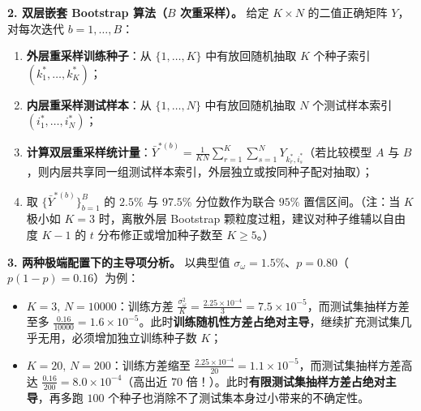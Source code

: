 \textbf{2. 双层嵌套 Bootstrap 算法（$B$ 次重采样）。}
给定 $K \times N$ 的二值正确矩阵 $Y$，对每次迭代 $b = 1, \dots, B$：
\begin{enumerate}
  \item \textbf{外层重采样训练种子}：从 $\{1,\dots,K\}$ 中有放回随机抽取 $K$ 个种子索引 $(k_1^*,\dots,k_K^*)$；
  \item \textbf{内层重采样测试样本}：从 $\{1,\dots,N\}$ 中有放回随机抽取 $N$ 个测试样本索引 $(i_1^*,\dots,i_N^*)$；
  \item \textbf{计算双层重采样统计量}：$\bar{Y}^{*(b)} = \frac{1}{KN}\sum_{r=1}^K\sum_{s=1}^N Y_{k_r^*, i_s^*}$（若比较模型 $A$ 与 $B$，则内层共享同一组测试样本索引，外层独立或按同种子配对抽取）；
  \item 取 $\{\bar{Y}^{*(b)}\}_{b=1}^B$ 的 $2.5\%$ 与 $97.5\%$ 分位数作为联合 $95\%$ 置信区间。（注：当 $K$ 极小如 $K=3$ 时，离散外层 Bootstrap 颗粒度过粗，建议对种子维辅以自由度 $K-1$ 的 $t$ 分布修正或增加种子数至 $K \ge 5$。）
\end{enumerate}

\textbf{3. 两种极端配置下的主导项分析。}
以典型值 $\sigma_\omega = 1.5\%$、$p = 0.80$（$p(1-p)=0.16$）为例：
\begin{itemize}
  \item \textbf{$K = 3,\, N = 10000$}：训练方差 $\frac{\sigma_\omega^2}{K} = \frac{2.25\times 10^{-4}}{3} = 7.5\times 10^{-5}$，而测试集抽样方差至多 $\frac{0.16}{10000} = 1.6\times 10^{-5}$。此时\textbf{训练随机性方差占绝对主导}，继续扩充测试集几乎无用，必须增加独立训练种子数 $K$；
  \item \textbf{$K = 20,\, N = 200$}：训练方差缩至 $\frac{2.25\times 10^{-4}}{20} = 1.1\times 10^{-5}$，而测试集抽样方差高达 $\frac{0.16}{200} = 8.0\times 10^{-4}$（高出近 $70$ 倍！）。此时\textbf{有限测试集抽样方差占绝对主导}，再多跑 $100$ 个种子也消除不了测试集本身过小带来的不确定性。
\end{itemize}


